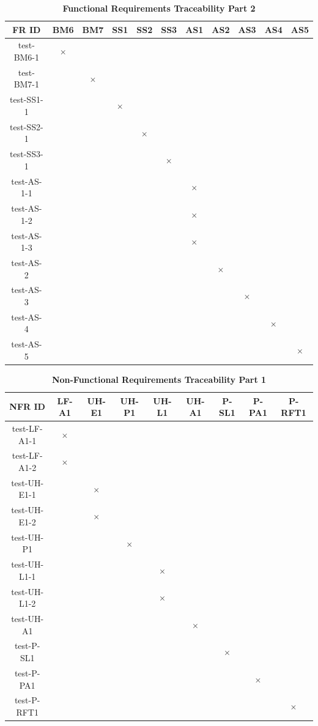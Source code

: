 \documentclass[12pt, titlepage]{article}
\begin{document}
\begin{table}[H]
\centering
\begin{tabular}{|c|c|c|c|c|c|c|c|c|c|c|}
\hline
FR ID & BM6 & BM7 & SS1 & SS2 & SS3 & AS1 & AS2 & AS3 & AS4 & AS5 \\
\hline 
test-BM6-1 & $\times$ & & & & & & & & & \\
test-BM7-1 & & $\times$ & & & & & & & & \\
test-SS1-1 & & & $\times$ & & & & & & & \\
test-SS2-1 & & & & $\times$ & & & & & & \\
test-SS3-1 & & & & & $\times$ & & & & & \\
test-AS-1-1 & & & & & &  $\times$ & & &  & \\
test-AS-1-2 & & & & & &  $\times$ & & &  & \\
test-AS-1-3 & & & & & &  $\times$ & & &  & \\
test-AS-2 & & & & & &   & $\times$ & &  & \\
test-AS-3 & & & & & & & & $\times$ &  & \\
test-AS-4 & & & & & & & & & $\times$ & \\
test-AS-5 & & & & & & & & & & $\times$ \\


\hline
\end{tabular}
\caption{\bf Functional Requirements Traceability Part 2}
\end{table}


\begin{table}[H]
\centering
\begin{tabular}{|c|c|c|c|c|c|c|c|c|}
\hline
NFR ID & LF-A1 & UH-E1 & UH-P1 & UH-L1 & UH-A1 & P-SL1 & P-PA1 & P-RFT1 \\
\hline 
test-LF-A1-1 & $\times$ & & & & & & &   \\
test-LF-A1-2 & $\times$  & & & & & & &   \\
test-UH-E1-1 &  & $\times$  & & & & & &   \\
test-UH-E1-2 &  & $\times$  & & & & & &   \\
test-UH-P1 &  &  & $\times$  & & & & &   \\
test-UH-L1-1 &  & & & $\times$  & & & &   \\
test-UH-L1-2 &  & & & $\times$  & & & &   \\
test-UH-A1 &  &  & & & $\times$   & & &   \\
test-P-SL1 &  &  & & &    & $\times$ & &   \\
test-P-PA1 &  &  & & &    &  & $\times$ &   \\
test-P-RFT1 &  &  & & &    &  &  & $\times$  \\
\hline
\end{tabular}
\caption{\bf Non-Functional Requirements Traceability Part 1}
\end{table}
\end{document}
